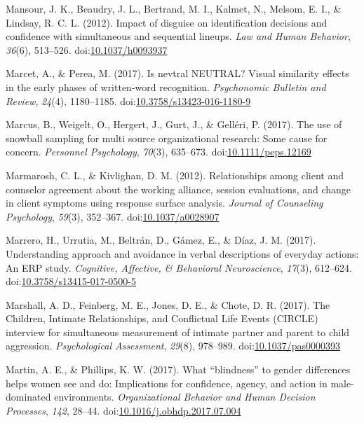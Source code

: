 \documentclass[english,man]{apa6}
\theoremstyle{definition}
\theoremstyle{definition}
\theoremstyle{definition}
\theoremstyle{remark}
\begin{document}
\hypertarget{ref-Mansour2012}{}
Mansour, J. K., Beaudry, J. L., Bertrand, M. I., Kalmet, N., Melsom, E.
I., \& Lindsay, R. C. L. (2012). Impact of disguise on identification
decisions and confidence with simultaneous and sequential lineups.
\emph{Law and Human Behavior}, \emph{36}(6), 513--526.
doi:\href{https://doi.org/10.1037/h0093937}{10.1037/h0093937}

\hypertarget{ref-Marcet2016}{}
Marcet, A., \& Perea, M. (2017). Is nevtral NEUTRAL? Visual similarity
effects in the early phases of written-word recognition.
\emph{Psychonomic Bulletin and Review}, \emph{24}(4), 1180--1185.
doi:\href{https://doi.org/10.3758/s13423-016-1180-9}{10.3758/s13423-016-1180-9}

\hypertarget{ref-Marcus2017}{}
Marcus, B., Weigelt, O., Hergert, J., Gurt, J., \& Gelléri, P. (2017).
The use of snowball sampling for multi source organizational research:
Some cause for concern. \emph{Personnel Psychology}, \emph{70}(3),
635--673.
doi:\href{https://doi.org/10.1111/peps.12169}{10.1111/peps.12169}

\hypertarget{ref-Marmarosh2012}{}
Marmarosh, C. L., \& Kivlighan, D. M. (2012). Relationships among client
and counselor agreement about the working alliance, session evaluations,
and change in client symptoms using response surface analysis.
\emph{Journal of Counseling Psychology}, \emph{59}(3), 352--367.
doi:\href{https://doi.org/10.1037/a0028907}{10.1037/a0028907}

\hypertarget{ref-Marrero2017}{}
Marrero, H., Urrutia, M., Beltrán, D., Gámez, E., \& Díaz, J. M. (2017).
Understanding approach and avoidance in verbal descriptions of everyday
actions: An ERP study. \emph{Cognitive, Affective, \& Behavioral
Neuroscience}, \emph{17}(3), 612--624.
doi:\href{https://doi.org/10.3758/s13415-017-0500-5}{10.3758/s13415-017-0500-5}

\hypertarget{ref-Marshall2017}{}
Marshall, A. D., Feinberg, M. E., Jones, D. E., \& Chote, D. R. (2017).
The Children, Intimate Relationships, and Conflictual Life Events
(CIRCLE) interview for simultaneous measurement of intimate partner and
parent to child aggression. \emph{Psychological Assessment},
\emph{29}(8), 978--989.
doi:\href{https://doi.org/10.1037/pas0000393}{10.1037/pas0000393}

\hypertarget{ref-Martin2017}{}
Martin, A. E., \& Phillips, K. W. (2017). What ``blindness'' to gender
differences helps women see and do: Implications for confidence, agency,
and action in male-dominated environments. \emph{Organizational Behavior
and Human Decision Processes}, \emph{142}, 28--44.
doi:\href{https://doi.org/10.1016/j.obhdp.2017.07.004}{10.1016/j.obhdp.2017.07.004}
\end{document}
